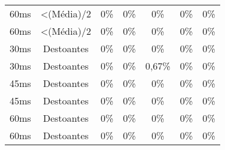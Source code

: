 \begin{table}[]
\begin{tabular}{|c|c|ccccc|}
60ms              & \textless (Média)/2 & 0\%            & 0\%            & 0\%            & 0\%            & 0\%            \\
60ms              & \textless (Média)/2 & 0\%            & 0\%            & 0\%            & 0\%            & 0\%            \\ \hline
30ms              & Destoantes          & 0\%            & 0\%            & 0\%            & 0\%            & 0\%            \\
30ms              & Destoantes          & 0\%            & 0\%            & 0,67\%            & 0\%            & 0\%            \\
45ms              & Destoantes          & 0\%            & 0\%            & 0\%            & 0\%            & 0\%            \\
45ms              & Destoantes          & 0\%            & 0\%            & 0\%            & 0\%            & 0\%            \\
60ms              & Destoantes          & 0\%            & 0\%            & 0\%            & 0\%            & 0\%            \\
60ms              & Destoantes          & 0\%            & 0\%            & 0\%            & 0\%            & 0\%            \\ \hline
\end{tabular}
\end{table}
